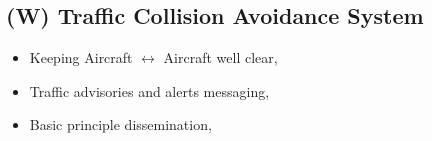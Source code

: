 \subsection{(W) Traffic Collision Avoidance System}\label{sec:TCAS}
\begin{itemize}
    \item Keeping Aircraft $\leftrightarrow$ Aircraft well clear,
    \item Traffic advisories and alerts messaging,
    \item Basic principle dissemination,
\end{itemize}

